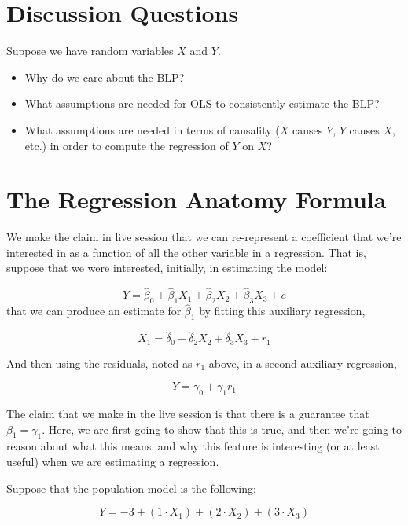 \documentclass[
]{book}
\providecommand{\tightlist}{%
  \setlength{\itemsep}{0pt}\setlength{\parskip}{0pt}}
\theoremstyle{definition}
\theoremstyle{definition}
\theoremstyle{definition}
\theoremstyle{definition}
\theoremstyle{remark}
\begin{document}
\section{Discussion Questions}\label{discussion-questions}

Suppose we have random variables \(X\) and \(Y\).

\begin{itemize}
\tightlist
\item
  Why do we care about the BLP?
\item
  What assumptions are needed for OLS to consistently estimate the BLP?
\item
  What assumptions are needed in terms of causality (\(X\) causes \(Y\), \(Y\) causes \(X\), etc.) in order to compute the regression of \(Y\) on \(X\)?
\end{itemize}

\section{The Regression Anatomy Formula}\label{the-regression-anatomy-formula}

We make the claim in live session that we can re-represent a coefficient that we're interested in as a function of all the other variable in a regression. That is, suppose that we were interested, initially, in estimating the model:

\[ 
Y = \hat\beta_{0} + \hat\beta_{1} X_{1} + \hat\beta_{2} X_{2} + \hat\beta_{3}X_{3} + e
\]
that we can produce an estimate for \(\hat\beta_{1}\) by fitting this auxiliary regression,

\[
X_{1} = \hat\delta_{0} + \hat\delta_2X_2 + \hat\delta_3X_3 + r_{1}
\]

And then using the residuals, noted as \(r_1\) above, in a second auxiliary regression,

\[ 
Y = \gamma_0 + \gamma_1 r_1
\]

The claim that we make in the live session is that there is a guarantee that \(\beta_1 = \gamma_1\). Here, we are first going to show that this is true, and then we're going to reason about what this means, and why this feature is interesting (or at least useful) when we are estimating a regression.

Suppose that the population model is the following:

\[
Y = -3 + (1\cdot X_1) + (2\cdot X_2) + (3\cdot X_3)
\]
\end{document}
